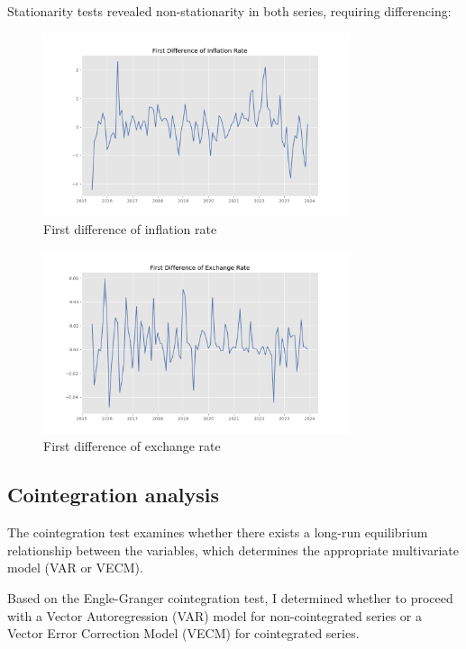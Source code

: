 \documentclass[11pt,a4paper]{article}
\begin{document}
Stationarity tests revealed non-stationarity in both series, requiring differencing:

\begin{figure}[H]
    \centering
    \includegraphics[width=0.8\textwidth]{plots/multivariate/inflation_diff.png}
    \caption{First difference of inflation rate}
    \label{fig:inflation_diff}
\end{figure}

\begin{figure}[H]
    \centering
    \includegraphics[width=0.8\textwidth]{plots/multivariate/exchange_diff.png}
    \caption{First difference of exchange rate}
    \label{fig:exchange_diff}
\end{figure}

\subsection{Cointegration analysis}

The cointegration test examines whether there exists a long-run equilibrium relationship between the variables, which determines the appropriate multivariate model (VAR or VECM).

Based on the Engle-Granger cointegration test, I determined whether to proceed with a Vector Autoregression (VAR) model for non-cointegrated series or a Vector Error Correction Model (VECM) for cointegrated series.
\end{document}
